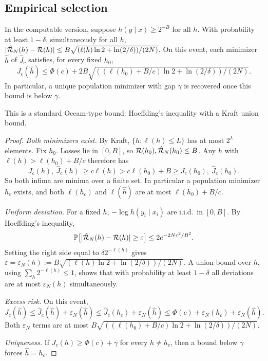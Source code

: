 \subsection{Empirical selection}\label{app:simplicity:empirical}

\begin{lemma}\label{lem:simplicity:empirical}
In the computable version, suppose $h(y\mid x)\ge2^{-B}$ for all $h$. With probability at least $1-\delta$, simultaneously for all $h$, $|\hat{\mathcal R}_N(h)-\mathcal R(h)|\le B\sqrt{(\ell(h)\ln2+\ln(2/\delta))/(2N)}$. On this event, each minimizer $\hat h$ of $\hat J_c$ satisfies, for every fixed $h_0$,
\[
J_c(\hat h)\le\Phi(c)+2B\sqrt{((\ell(h_0)+B/c)\ln2+\ln(2/\delta))/(2N)}.
\]
In particular, a unique population minimizer with gap $\gamma$ is recovered once this bound is below $\gamma$.
\end{lemma}

This is a standard Occam-type bound: Hoeffding's inequality with a Kraft union bound.

\begin{proof}
\emph{Both minimizers exist.} By Kraft, $\{h:\ell(h)\le L\}$ has at most $2^L$ elements. Fix $h_0$. Losses lie in $[0,B]$, so $\mathcal R(h_0),\hat{\mathcal R}_N(h_0)\le B$. Any $h$ with $\ell(h)>\ell(h_0)+B/c$ therefore has
\[
J_c(h),\ \hat J_c(h)\ \ge c\ell(h)>c\ell(h_0)+B\ge J_c(h_0),\ \hat J_c(h_0).
\]
So both infima are minima over a finite set. In particular a population minimizer $h_c$ exists, and both $\ell(h_c)$ and $\ell(\hat h)$ are at most $\ell(h_0)+B/c$.

\emph{Uniform deviation.} For a fixed $h$, $-\log h(y_i\mid x_i)$ are i.i.d.\ in $[0,B]$. By Hoeffding's inequality,
\[
\mathbb{P}\big[|\hat{\mathcal R}_N(h)-\mathcal R(h)|\ge\varepsilon\big]\le2e^{-2N\varepsilon^2/B^2}.
\]
Setting the right side equal to $\delta2^{-\ell(h)}$ gives $\varepsilon=\varepsilon_N(h):=B\sqrt{(\ell(h)\ln2+\ln(2/\delta))/(2N)}$. A union bound over $h$, using $\sum_h2^{-\ell(h)}\le1$, shows that with probability at least $1-\delta$ all deviations are at most $\varepsilon_N(h)$ simultaneously.

\emph{Excess risk.} On this event,
\[
J_c(\hat h)\le\hat J_c(\hat h)+\varepsilon_N(\hat h)\le\hat J_c(h_c)+\varepsilon_N(\hat h)\le\Phi(c)+\varepsilon_N(h_c)+\varepsilon_N(\hat h).
\]
Both $\varepsilon_N$ terms are at most $B\sqrt{((\ell(h_0)+B/c)\ln2+\ln(2/\delta))/(2N)}$.

\emph{Uniqueness.} If $J_c(h)\ge\Phi(c)+\gamma$ for every $h\neq h_c$, then a bound below $\gamma$ forces $\hat h=h_c$.
\end{proof}

